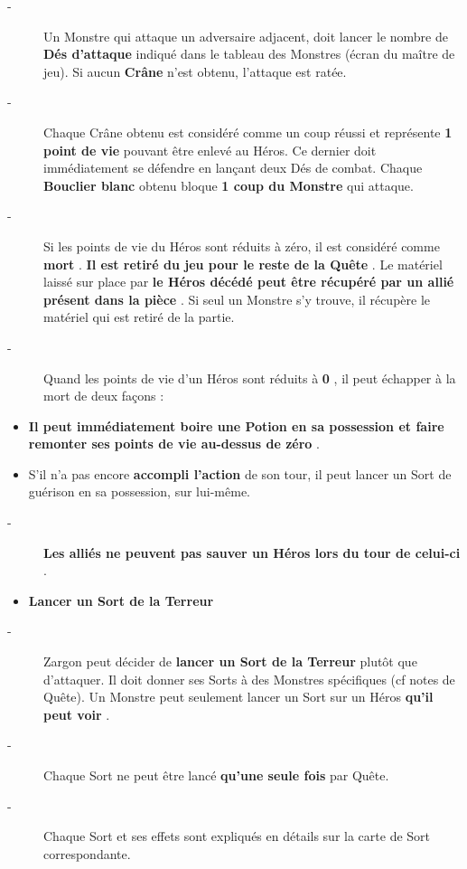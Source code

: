 \documentclass{scrartcl}%
\begin{document}
%
\begin{description}%
\item[{-} ]%
%
 Un Monstre qui attaque un adversaire adjacent, doit lancer le nombre de %
\textbf{Dés d'attaque}%
\textit{ }%
 indiqué dans le tableau des Monstres (écran du maître de jeu). Si aucun %
\textbf{Crâne}%
\textit{ }%
 n'est obtenu, l'attaque est ratée.
%
\item[{-} ]%
%
 Chaque Crâne obtenu est considéré comme un coup réussi et représente %
\textbf{1 point de vie}%
\textit{ }%
 pouvant être enlevé au Héros. Ce dernier doit immédiatement se défendre en lançant deux Dés de combat. Chaque %
\textbf{Bouclier blanc}%
\textit{ }%
 obtenu bloque %
\textbf{1 coup du Monstre}%
\textit{ }%
 qui attaque.
%
\item[{-} ]%
%
 Si les points de vie du Héros sont réduits à zéro, il est considéré comme %
\textbf{mort}%
. %
\textbf{Il est retiré du jeu pour le reste de la Quête}%
. Le matériel laissé sur place par %
\textbf{le Héros décédé peut être récupéré par un allié présent dans la pièce}%
. Si seul un Monstre s'y trouve, il récupère le matériel qui est retiré de la partie.
%
\item[{-} ]%
%
 Quand les points de vie d'un Héros sont réduits à %
\textbf{0}%
, il peut échapper à la mort de deux façons :
%
\end{description}%
\begin{itemize}%
\item%
%
\textbf{Il peut immédiatement boire une Potion en sa possession et faire remonter ses points de vie au{-}dessus de zéro}%
.
%
\item%
%
 S'il n'a pas encore %
\textbf{accompli l'action}%
\textit{ }%
 de son tour, il peut lancer un Sort de guérison en sa possession, sur lui{-}même.
%
\end{itemize}%
\begin{description}%
\item[{-} ]%
%
\textbf{Les alliés ne peuvent pas sauver un Héros lors du tour de celui{-}ci}%
.
%
\end{description}%
\begin{itemize}%
\item%
%
\textbf{Lancer un Sort de la Terreur}%

%
\end{itemize}%
\begin{description}%
\item[{-} ]%
%
 Zargon peut décider de %
\textbf{lancer un Sort de la Terreur}%
\textit{ }%
 plutôt que d'attaquer. Il doit donner ses Sorts à des Monstres spécifiques (cf notes de Quête). Un Monstre peut seulement lancer un Sort sur un Héros %
\textbf{qu'il peut voir}%
.
%
\item[{-} ]%
%
 Chaque Sort ne peut être lancé %
\textbf{qu'une seule fois}%
\textit{ }%
 par Quête.
%
\item[{-} ]%
%
 Chaque Sort et ses effets sont expliqués en détails sur la carte de Sort correspondante.
%
\end{description}
\end{document}
